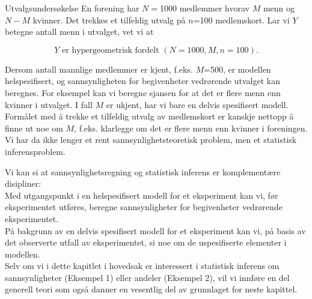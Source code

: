 \begin{eksempel}{Utvalgsundersøkelse}
En forening har $N=$1000 medlemmer hvorav $M$ menn og $N-M$
kvinner. Det trekkes et tilfeldig utvalg på $n$=100 medlemskort.
Lar vi $Y$ betegne antall menn i utvalget, vet vi at

\[ Y  \mbox{\ \  er hypergeometrisk fordelt $(N=1000, M, n=100)$.} \]

\noindent Dersom antall mannlige medlemmer er kjent, f.eks. $M$=500, er
modellen helspesifisert, og sannsynligheten for begivenheter
vedrørende utvalget kan beregnes. For eksempel kan vi beregne
sjansen for at det er flere menn enn kvinner i utvalget. I fall
$M$ er ukjent, har vi bare en delvis spesifisert mo\-dell. Formålet
med å trekke et tilfeldig utvalg av medlemskort er kanskje
nettopp å finne ut noe om $M$, f.eks. klarlegge om det er flere
menn enn kvinner i foreningen. Vi har da ikke lenger et rent
sannsynlighetsteoretisk problem, men et statistisk
inferensproblem. \\
\end{eksempel}

Vi kan si at sannsynlighetsregning og statistisk inferens er
komplementære disipliner:\\

 Med utgangspunkt i en
     helspesifisert modell for et eksperiment kan vi, før
     eksperimentet utføres, beregne sannsynligheter for
     begivenheter vedrørende eksperimentet.\\

 På bakgrunn av en delvis
     spesifisert modell for et eksperiment kan vi, på basis av
     det observerte utfall av eksperimentet, si noe om de
     uspesifiserte elementer i modellen. \\

Selv om vi i dette kapitlet i hovedsak er interessert i
statistisk inferens om sannsynligheter (Eksempel 1) eller andeler
(Eksempel 2), vil vi innføre en del generell teori som også
danner en vesentlig del av grunnlaget for neste kapittel.


